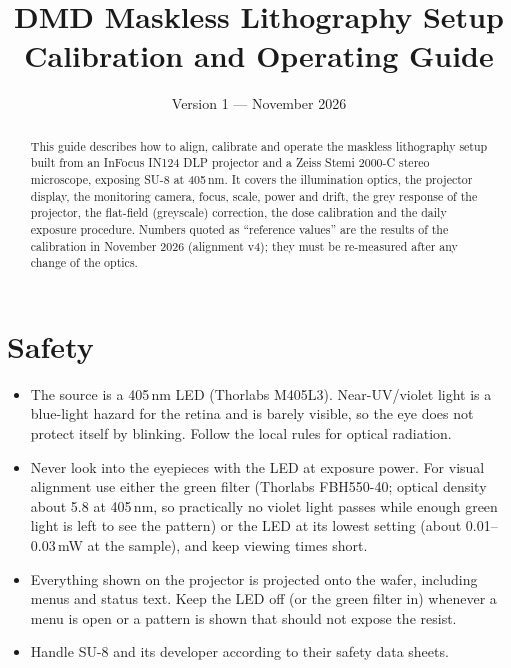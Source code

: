 \documentclass[11pt,a4paper]{article}
\title{\textbf{DMD Maskless Lithography Setup}\\[4pt]\large Calibration and Operating Guide}
\author{}
\date{Version 1 --- November 2026}
\begin{document}
\maketitle
\thispagestyle{fancy}

\begin{abstract}
\noindent This guide describes how to align, calibrate and operate the maskless lithography setup built from an
InFocus IN124 DLP projector and a Zeiss Stemi 2000-C stereo microscope, exposing SU-8 at 405\,nm. It covers the
illumination optics, the projector display, the monitoring camera, focus, scale, power and drift, the grey response
of the projector, the flat-field (greyscale) correction, the dose calibration and the daily exposure procedure.
Numbers quoted as ``reference values'' are the results of the calibration in November 2026 (alignment v4); they
must be re-measured after any change of the optics.
\end{abstract}

\tableofcontents
\newpage

\section{Safety}
\begin{itemize}
  \item The source is a 405\,nm LED (Thorlabs M405L3). Near-UV/violet light is a blue-light hazard for the retina
        and is barely visible, so the eye does not protect itself by blinking. Follow the local rules for optical
        radiation.
  \item Never look into the eyepieces with the LED at exposure power. For visual alignment use either the green
        filter (Thorlabs FBH550-40; optical density about 5.8 at 405\,nm, so practically no violet light passes
        while enough green light is left to see the pattern) or the LED at its lowest setting
        (about 0.01--0.03\,mW at the sample), and keep viewing times short.
  \item Everything shown on the projector is projected onto the wafer, including menus and status text. Keep the LED
        off (or the green filter in) whenever a menu is open or a pattern is shown that should not expose the resist.
  \item Handle SU-8 and its developer according to their safety data sheets.
\end{itemize}

\end{document}
